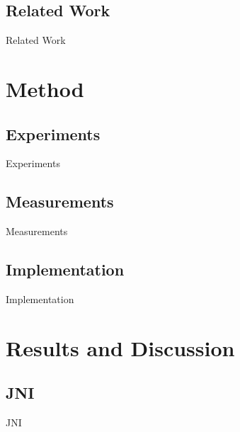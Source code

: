 \documentclass{beamer}
\begin{document}
\subsection{Related Work}
\begin{frame}{Related Work}
\end{frame}

\section{Method}

\subsection{Experiments}
\begin{frame}{Experiments}
\end{frame}

\subsection{Measurements}
\begin{frame}{Measurements}
\end{frame}

\subsection{Implementation}
\begin{frame}{Implementation}
\end{frame}

\section{Results and Discussion}
\subsection{JNI}
\begin{frame}{JNI}
\end{frame}
\end{document}
